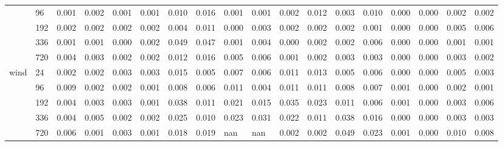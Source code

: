 \begin{tabular}{llllllllllllllllll}
 & 96 & 0.001 & 0.002 & 0.001 & 0.001 & 0.010 & 0.016 & 0.001 & 0.001 & 0.002 & 0.012 & 0.003 & 0.010 & 0.000 & 0.000 & 0.002 & 0.002 \\
 & 192 & 0.002 & 0.002 & 0.002 & 0.002 & 0.004 & 0.011 & 0.000 & 0.003 & 0.002 & 0.002 & 0.002 & 0.001 & 0.000 & 0.000 & 0.005 & 0.006 \\
 & 336 & 0.001 & 0.001 & 0.000 & 0.002 & 0.049 & 0.047 & 0.001 & 0.004 & 0.000 & 0.002 & 0.002 & 0.006 & 0.000 & 0.000 & 0.001 & 0.001 \\
 & 720 & 0.004 & 0.003 & 0.002 & 0.002 & 0.012 & 0.016 & 0.005 & 0.006 & 0.001 & 0.002 & 0.003 & 0.003 & 0.000 & 0.000 & 0.003 & 0.002 \\
\cline{1-18}
\multirow[t]{5}{*}{wind} & 24 & 0.002 & 0.002 & 0.003 & 0.003 & 0.015 & 0.005 & 0.007 & 0.006 & 0.011 & 0.013 & 0.005 & 0.006 & 0.000 & 0.000 & 0.005 & 0.003 \\
 & 96 & 0.009 & 0.002 & 0.002 & 0.001 & 0.008 & 0.006 & 0.011 & 0.004 & 0.011 & 0.011 & 0.008 & 0.007 & 0.001 & 0.000 & 0.002 & 0.001 \\
 & 192 & 0.004 & 0.003 & 0.003 & 0.001 & 0.038 & 0.011 & 0.021 & 0.015 & 0.035 & 0.023 & 0.011 & 0.006 & 0.001 & 0.000 & 0.003 & 0.006 \\
 & 336 & 0.004 & 0.005 & 0.002 & 0.002 & 0.025 & 0.010 & 0.023 & 0.031 & 0.022 & 0.011 & 0.038 & 0.016 & 0.000 & 0.000 & 0.003 & 0.003 \\
 & 720 & 0.006 & 0.001 & 0.003 & 0.001 & 0.018 & 0.019 & nan & nan & 0.002 & 0.002 & 0.049 & 0.023 & 0.001 & 0.000 & 0.010 & 0.008 \\
\cline{1-18}
\bottomrule
\end{tabular}
